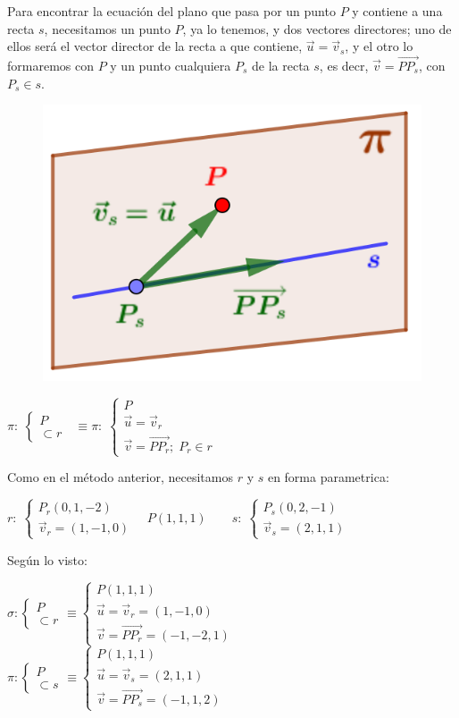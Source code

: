 Para encontrar la ecuación del plano que pasa por un punto $P$ y contiene a una recta $s$, necesitamos un punto $P$, ya lo tenemos, y dos vectores directores; uno de ellos será el vector director de la recta a que contiene, $\vec u=\vec v_s$, y el otro lo formaremos con $P$ y un punto cualquiera $P_s$ de la recta $s$, es decr, $\vec v=\overrightarrow{PP_s}$, con $P_s \in s$.

\begin{multicols}{2}
\begin{figure}[H]
	\centering
	\includegraphics[width=.3\textwidth]{imagenes/imagenes10/T10IM20.png}
\end{figure}
\noindent \footnotesize{$\pi:\;\begin{cases} P \\ \subset r \end{cases} $
$\;\equiv \pi:\; \begin{cases} P \\ \vec u=\vec v_r \\ \vec v=\overrightarrow{PP_r} ;\; P_r \in r \end{cases}$}
\end{multicols}


\normalsize{Como} en el método anterior, necesitamos $r$ y $s$ en forma parametrica:

$r:\;\begin{cases} P_r(0,1,-2) \\ \vec v_r=(1,-1,0) \end{cases} \quad
P(1,1,1) \qquad 	
s:\; \begin{cases} P_s(0,2,-1) \\ \vec v_s=(2,1,1) \end{cases} $

Según lo visto:

\small{$\sigma: \begin{cases} P\\ \subset r \end{cases} \equiv \begin{cases} P(1,1,1)\\ \vec u=\vec v_r=(1,-1,0) \\ \vec v=\overrightarrow{PP_r}=(-1,-2,1) \end{cases}$ 
$\pi: \begin{cases} P \\ \subset s \end{cases} \equiv \begin{cases} P(1,1,1) \\ \vec u=\vec v_s=(2,1,1) \\ \vec v = \overrightarrow{PP_s}=(-1,1,2) \end{cases}  $}

